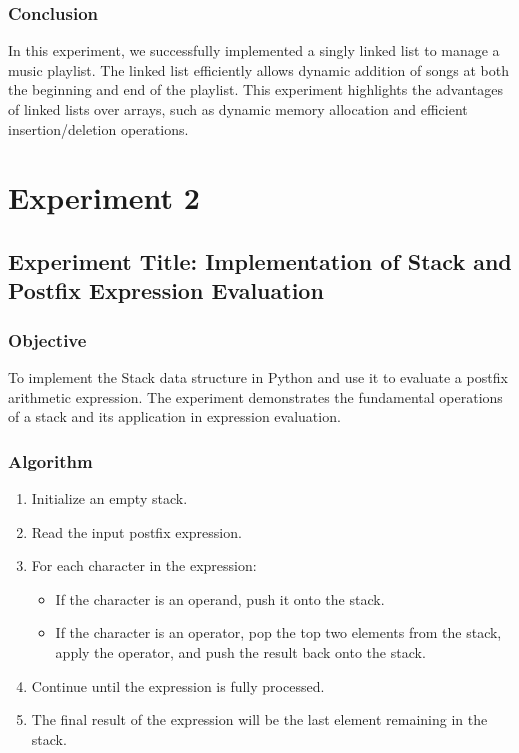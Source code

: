 \documentclass[a4paper,12pt]{article}
\begin{document}
\subsubsection*{Conclusion}
In this experiment, we successfully implemented a singly linked list to manage a music playlist. The linked list efficiently allows dynamic addition of songs at both the beginning and end of the playlist. This experiment highlights the advantages of linked lists over arrays, such as dynamic memory allocation and efficient insertion/deletion operations.

\clearpage

\section*{ Experiment 2}
\label{sec:exp2}
\subsection*{Experiment Title: Implementation of Stack and Postfix Expression Evaluation}

\subsubsection*{Objective}
To implement the Stack data structure in Python and use it to evaluate a postfix arithmetic expression. The experiment demonstrates the fundamental operations of a stack and its application in expression evaluation.

\subsubsection*{Algorithm}
\begin{enumerate}
    \item Initialize an empty stack.
    \item Read the input postfix expression.
    \item For each character in the expression:
    \begin{itemize}
        \item If the character is an operand, push it onto the stack.
        \item If the character is an operator, pop the top two elements from the stack, apply the operator, and push the result back onto the stack.
    \end{itemize}
    \item Continue until the expression is fully processed.
    \item The final result of the expression will be the last element remaining in the stack.
\end{enumerate}
\end{document}
